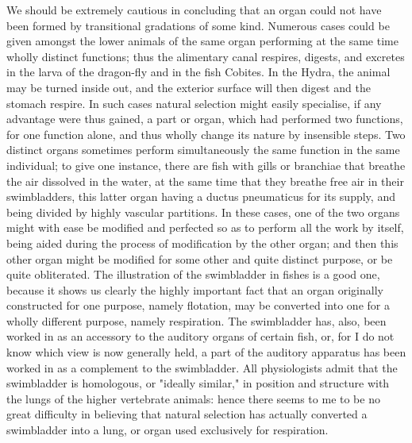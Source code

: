 We should be extremely cautious in concluding that an organ could not have been formed by transitional gradations of some kind. Numerous cases could be given amongst the lower animals of the same organ performing at the same time wholly distinct functions; thus the alimentary canal respires, digests, and excretes in the larva of the dragon-fly and in the fish Cobites. In the Hydra, the animal may be turned inside out, and the exterior surface will then digest and the stomach respire. In such cases natural selection might easily specialise, if any advantage were thus gained, a part or organ, which had performed two functions, for one function alone, and thus wholly change its nature by insensible steps. Two distinct organs sometimes perform simultaneously the same function in the same individual; to give one instance, there are fish with gills or branchiae that breathe the air dissolved in the water, at the same time that they breathe free air in their swimbladders, this latter organ having a ductus pneumaticus for its supply, and being divided by highly vascular partitions. In these cases, one of the two organs might with ease be modified and perfected so as to perform all the work by itself, being aided during the process of modification by the other organ; and then this other organ might be modified for some other and quite distinct purpose, or be quite obliterated.
The illustration of the swimbladder in fishes is a good one, because it shows us clearly the highly important fact that an organ originally constructed for one purpose, namely flotation, may be converted into one for a wholly different purpose, namely respiration. The swimbladder has, also, been worked in as an accessory to the auditory organs of certain fish, or, for I do not know which view is now generally held, a part of the auditory apparatus has been worked in as a complement to the swimbladder. All physiologists admit that the swimbladder is homologous, or "ideally similar," in position and structure with the lungs of the higher vertebrate animals: hence there seems to me to be no great difficulty in believing that natural selection has actually converted a swimbladder into a lung, or organ used exclusively for respiration.
